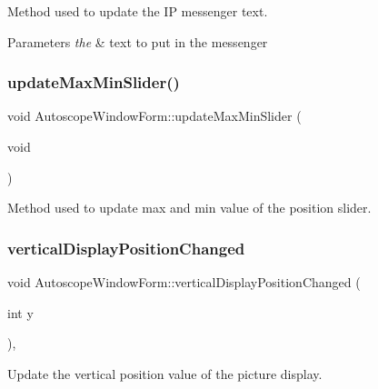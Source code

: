 Method used to update the IP messenger text. 


\begin{DoxyParams}{Parameters}
{\em the} & text to put in the messenger \\
\hline
\end{DoxyParams}
\mbox{\label{class_autoscope_window_form_a599b2ec55d4051832dea26cc715265fe}} 
\subsubsection{\texorpdfstring{updateMaxMinSlider()}{updateMaxMinSlider()}}
{\footnotesize\ttfamily void Autoscope\+Window\+Form\+::update\+Max\+Min\+Slider (\begin{DoxyParamCaption}\item[{void}]{ }\end{DoxyParamCaption})\hspace{0.3cm}{\ttfamily [private]}}



Method used to update max and min value of the position slider. 

\mbox{\label{class_autoscope_window_form_a775044eeb0c9bf094512c82d2c538ad0}} 
\subsubsection{\texorpdfstring{verticalDisplayPositionChanged}{verticalDisplayPositionChanged}}
{\footnotesize\ttfamily void Autoscope\+Window\+Form\+::vertical\+Display\+Position\+Changed (\begin{DoxyParamCaption}\item[{int}]{y }\end{DoxyParamCaption})\hspace{0.3cm}{\ttfamily [private]}, {\ttfamily [slot]}}



Update the vertical position value of the picture display. 

